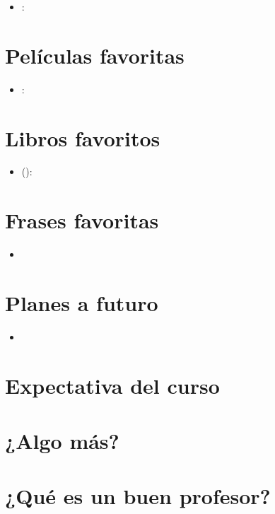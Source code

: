 \documentclass[12pt]{article} %
\begin{document}
\begin{itemize}
\item \textbf{}:
\end{itemize}


\section*{Películas favoritas}

\begin{itemize}
\item \textbf{}:
\end{itemize}

\section*{Libros favoritos}

\begin{itemize}
\item \textbf{} ():
\end{itemize}

\section*{Frases favoritas}

\begin{itemize}
\item \textit{} \textbf{}
\end{itemize}

\section*{Planes a futuro}

\begin{itemize}
\item 
\end{itemize}

\section*{Expectativa del curso}


\section*{¿Algo más?}

\section*{¿Qué es un buen profesor?}
\end{document}
